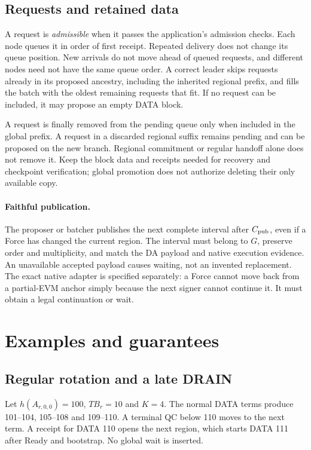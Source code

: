 \documentclass[11pt,a4paper]{article}
\newcommand{\TB}{\mathit{TB}}
\newcommand{\defterm}[1]{\textcolor{rrBlue}{\textit{#1}}}
\begin{document}
\subsection{Requests and retained data}
\label{sec:requests}
A request is \defterm{admissible} when it passes the application's admission
checks. Each node queues it in order of first receipt. Repeated delivery
does not change its queue position. New arrivals do not move
ahead of queued requests, and different nodes need not have the same
queue order. A correct leader skips requests
already in its proposed ancestry, including the inherited regional
prefix, and fills the batch with the oldest remaining requests that fit.
If no request can be included, it may propose an empty DATA block.

A request is finally removed from the pending queue only when included
in the global prefix. A request in a discarded regional suffix remains
pending and can be proposed on the new branch. Regional commitment or
regular handoff alone does not remove it. Keep the block data and
receipts needed for recovery and checkpoint verification; global
promotion does not authorize deleting their only available copy.



\paragraph{Faithful publication.}
The proposer or batcher publishes the next complete interval after
$C_{\rm pub}$, even if a Force has changed the current region.
The interval must belong to $G$, preserve order and multiplicity, and
match the DA payload and native execution evidence. An unavailable
accepted payload causes waiting, not an invented replacement.
The exact native adapter is specified separately: a Force cannot move
back from a partial-EVM anchor simply because the next signer cannot
continue it. It must obtain a legal continuation or wait.

\section{Examples and guarantees}
\label{sec:examples}
\subsection{Regular rotation and a late DRAIN}
\label{sec:regular-example}
Let $h(A_{r,0,0})=100$, $\TB_r=10$ and $K=4$. The normal DATA terms
produce 101--104, 105--108 and 109--110. A terminal QC below 110 moves
to the next term. A receipt for DATA 110 opens the next region, which
starts DATA 111 after Ready and bootstrap. No global wait is inserted.
\end{document}
